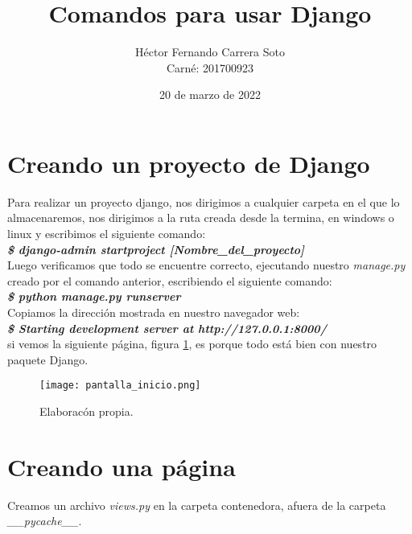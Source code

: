 \documentclass[12pt,letterpaper]{article}
\author{Héctor Fernando Carrera Soto \\
 Carné: 201700923}
\title{Comandos para usar Django}
\date{20 de marzo de 2022}
\begin{document}


\maketitle


\section{Creando un proyecto de Django}

Para realizar un proyecto django, nos dirigimos a cualquier carpeta en el que lo almacenaremos, nos dirigimos a la ruta creada desde la termina, en windows o linux y escribimos el siguiente comando:\\

\textbf{\emph{\$ django-admin startproject [Nombre\_del\_proyecto]}}\\

Luego verificamos que todo se encuentre correcto, ejecutando nuestro \emph{manage.py} creado por el comando anterior, escribiendo el siguiente comando:\\

\textbf{\emph{\$ python manage.py runserver}}\\

Copiamos la dirección mostrada en nuestro navegador web:\\

\textbf{\emph{\$ Starting development server at http://127.0.0.1:8000/
}}\\

si vemos la siguiente página, figura \ref{fig_pantalla_inicio}, es porque todo está bien con nuestro paquete Django.\\

\begin{figure}[H]
\centering
\texttt{[image: pantalla\_inicio.png]}
\caption{Elaboracón propia.}
\label{fig_pantalla_inicio}
\end{figure}


\section{Creando una página}

Creamos un archivo \emph{views.py} en la carpeta contenedora, afuera de la carpeta \emph{\_\_pycache\_\_}.\\
\end{document}
